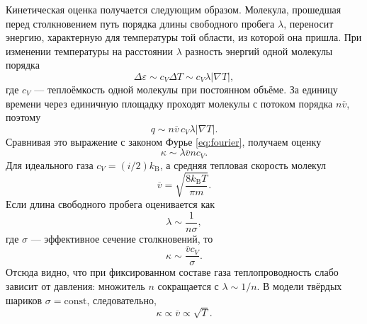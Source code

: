 \documentclass[a4paper,12pt]{article}
\newcommand{\eps}{\varepsilon}
\begin{document}
Кинетическая оценка получается следующим образом. Молекула, прошедшая перед столкновением путь порядка длины свободного пробега $\lambda$, переносит энергию, характерную для температуры той области, из которой она пришла. При изменении температуры на расстоянии $\lambda$ разность энергий одной молекулы порядка
\[
\Delta \eps\sim c_V\Delta T\sim c_V\lambda |\nabla T|,
\]
где $c_V$ --- теплоёмкость одной молекулы при постоянном объёме. За единицу времени через единичную площадку проходят молекулы с потоком порядка $n\overline v$, поэтому
\[
q\sim n\overline v\,c_V\lambda |\nabla T|.
\]
Сравнивая это выражение с законом Фурье \eqref{eq:fourier}, получаем оценку
\begin{equation}
\kappa\sim \lambda \overline v n c_V.
\label{eq:kappa_mkt}
\end{equation}
Для идеального газа $c_V=(i/2)k_{\mathrm B}$, а средняя тепловая скорость молекул
\[
\overline v=\sqrt{\frac{8k_{\mathrm B}T}{\pi m}}.
\]
Если длина свободного пробега оценивается как
\[
\lambda\sim\frac{1}{n\sigma},
\]
где $\sigma$ --- эффективное сечение столкновений, то
\[
\kappa\sim \frac{\overline v c_V}{\sigma}.
\]
Отсюда видно, что при фиксированном составе газа теплопроводность слабо зависит от давления: множитель $n$ сокращается с $\lambda\sim 1/n$. В модели твёрдых шариков $\sigma=\mathrm{const}$, следовательно,
\begin{equation}
\kappa\propto \overline v\propto \sqrt{T}.
\label{eq:hard_spheres}
\end{equation}
\end{document}

